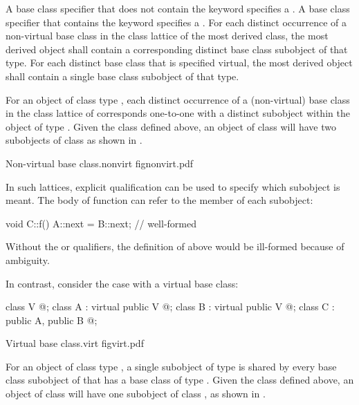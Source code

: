 \pnum
{}%
A base class specifier that does not contain the keyword
 specifies a . A base
class specifier that contains the keyword  specifies a
. For each distinct occurrence of a
non-virtual base class in the class lattice of the most derived class,
the most derived object shall contain a
corresponding distinct base class subobject of that type. For each
distinct base class that is specified virtual, the most derived object
shall contain a single base class subobject of that type.

\pnum
\begin{note}
For an object of class type , each distinct occurrence of a
(non-virtual) base class  in the class lattice of 
corresponds one-to-one with a distinct  subobject within the
object of type . Given the class  defined above, an
object of class  will have two subobjects of class  as
shown in .

\begin{importgraphic}
{Non-virtual base}
{class.nonvirt}
{fignonvirt.pdf}
\end{importgraphic}

In such lattices, explicit qualification can be used to specify which
subobject is meant. The body of function  can refer to the
member  of each  subobject:
\begin{codeblock}
void C::f() { A::next = B::next; }      // well-formed
\end{codeblock}
Without the  or  qualifiers, the definition of
 above would be ill-formed because of
ambiguity.
\end{note}

\pnum
\begin{note}
In contrast, consider the case with a virtual base class:
\begin{codeblock}
class V { @\commentellip@ };
class A : virtual public V { @\commentellip@ };
class B : virtual public V { @\commentellip@ };
class C : public A, public B { @\commentellip@ };
\end{codeblock}
\begin{importgraphic}
{Virtual base}
{class.virt}
{figvirt.pdf}
\end{importgraphic}
For an object  of class type , a single subobject of
type  is shared by every base class subobject of  that has a
 base class of type . Given the class 
defined above, an object of class  will have one subobject of
class , as shown in .
%
%
\end{note}

